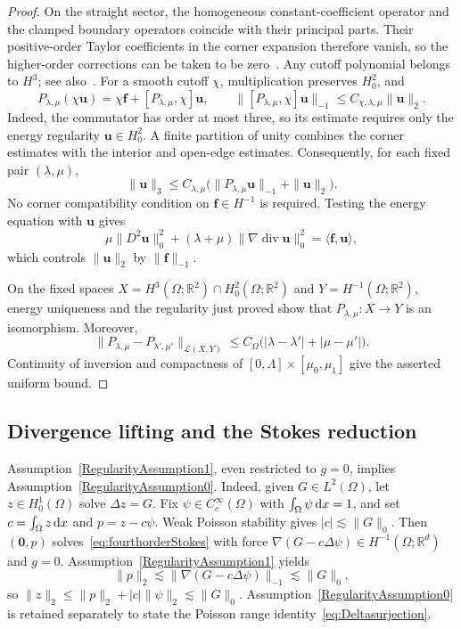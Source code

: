 \documentclass[10pt]{amsart}
\newcommand{\dx}{\,{\rm d}x}
\renewcommand{\div}{\operatorname{div}}
\numberwithin{equation}{section}
\begin{document}
\begin{proof}
On the straight sector, the homogeneous constant-coefficient operator and the clamped boundary operators coincide with their principal parts. Their positive-order Taylor coefficients in the corner expansion therefore vanish, so the higher-order corrections can be taken to be zero~\cite[Sections~4.a--b, equations~(4.9)--(4.10), pp.~1713--1714]{CostabelDauge1994}. Any cutoff polynomial belongs to $H^3$; see also~\cite[Remark~4.7(ii), p.~1717]{CostabelDauge1994}. For a smooth cutoff $\chi$, multiplication preserves $H_0^2$, and
\[
P_{\lambda,\mu}(\chi\boldsymbol u)
=\chi\boldsymbol f+[P_{\lambda,\mu},\chi]\boldsymbol u,
\qquad
\|[P_{\lambda,\mu},\chi]\boldsymbol u\|_{-1}
\leq C_{\chi,\lambda,\mu}\|\boldsymbol u\|_2.
\]
Indeed, the commutator has order at most three, so its estimate requires only the energy regularity $\boldsymbol u\in H_0^2$. A finite partition of unity combines the corner estimates with the interior and open-edge estimates. Consequently, for each fixed pair $(\lambda,\mu)$,
\[
\|\boldsymbol u\|_3\leq C_{\lambda,\mu}
\big(\|P_{\lambda,\mu}\boldsymbol u\|_{-1}+\|\boldsymbol u\|_2\big).
\]
No corner compatibility condition on $\boldsymbol f\in H^{-1}$ is required. Testing the energy equation with $\boldsymbol u$ gives
\[
\mu\|D^2\boldsymbol u\|_0^2
+(\lambda+\mu)\|\nabla\div\boldsymbol u\|_0^2
=\langle\boldsymbol f,\boldsymbol u\rangle,
\]
which controls $\|\boldsymbol u\|_2$ by $\|\boldsymbol f\|_{-1}$.

On the fixed spaces
$X=H^3(\Omega;\mathbb R^2)\cap H_0^2(\Omega;\mathbb R^2)$ and
$Y=H^{-1}(\Omega;\mathbb R^2)$, energy uniqueness and the regularity just proved show that $P_{\lambda,\mu}:X\to Y$ is an isomorphism. Moreover,
\[
\|P_{\lambda,\mu}-P_{\lambda',\mu'}\|_{\mathcal L(X,Y)}
\leq C_\Omega\big(|\lambda-\lambda'|+|\mu-\mu'|\big).
\]
Continuity of inversion and compactness of $[0,\Lambda]\times[\mu_0,\mu_1]$ give the asserted uniform bound.
\end{proof}

\subsection{Divergence lifting and the Stokes reduction}

Assumption~\ref{RegularityAssumption1}, even restricted to $g=0$, implies Assumption~\ref{RegularityAssumption0}. Indeed, given $G\in L^2(\Omega)$, let $z\in H_0^1(\Omega)$ solve $\Delta z=G$. Fix $\psi\in C_c^\infty(\Omega)$ with $\int_\Omega\psi\dx=1$, and set $c=\int_\Omega z\dx$ and $p=z-c\psi$. Weak Poisson stability gives $|c|\lesssim\|G\|_0$. Then $(\boldsymbol0,p)$ solves~\eqref{eq:fourthorderStokes} with force $\nabla(G-c\Delta\psi)\in H^{-1}(\Omega;\mathbb R^d)$ and $g=0$. Assumption~\ref{RegularityAssumption1} yields
\[
\|p\|_2\lesssim\|\nabla(G-c\Delta\psi)\|_{-1}\lesssim\|G\|_0,
\]
so $\|z\|_2\leq\|p\|_2+|c|\|\psi\|_2\lesssim\|G\|_0$. Assumption~\ref{RegularityAssumption0} is retained separately to state the Poisson range identity~\eqref{eq:Deltasurjection}.
\end{document}
